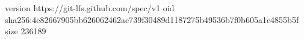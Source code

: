 version https://git-lfs.github.com/spec/v1
oid sha256:4e82667905bb626062462ac739f30489d1187275b49536b7f0b605a1e4855b5f
size 236189
